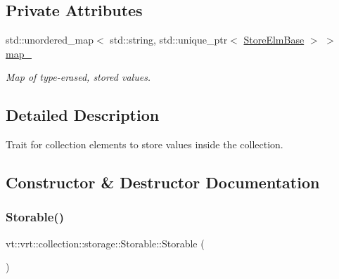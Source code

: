 \subsection*{Private Attributes}
\begin{DoxyCompactItemize}
\item 
std\+::unordered\+\_\+map$<$ std\+::string, std\+::unique\+\_\+ptr$<$ \hyperlink{structvt_1_1vrt_1_1collection_1_1storage_1_1_store_elm_base}{Store\+Elm\+Base} $>$ $>$ \hyperlink{structvt_1_1vrt_1_1collection_1_1storage_1_1_storable_ade35c0e0ef45b53ffad56cbc349cfb82}{map\+\_\+}
\begin{DoxyCompactList}\small\item\em Map of type-\/erased, stored values. \end{DoxyCompactList}\end{DoxyCompactItemize}


\subsection{Detailed Description}
Trait for collection elements to store values inside the collection. 

\subsection{Constructor \& Destructor Documentation}
\mbox{\label{structvt_1_1vrt_1_1collection_1_1storage_1_1_storable_aa6cb609d17c3fffd1416842cf9cc27e9}} 
\subsubsection{\texorpdfstring{Storable()}{Storable()}\hspace{0.1cm}{\footnotesize\ttfamily [1/2]}}
{\footnotesize\ttfamily vt\+::vrt\+::collection\+::storage\+::\+Storable\+::\+Storable (\begin{DoxyParamCaption}{ }\end{DoxyParamCaption})\hspace{0.3cm}{\ttfamily [default]}}

\mbox{\label{structvt_1_1vrt_1_1collection_1_1storage_1_1_storable_a5a3e15eefa62b57645c73b06a0ffcbea}} 
